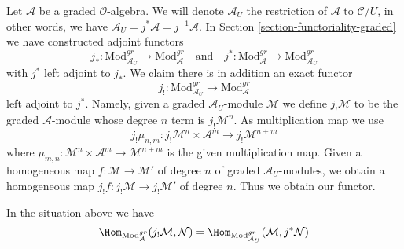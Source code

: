 \medskip\noindent
Let $\mathcal{A}$ be a graded $\mathcal{O}$-algebra.
We will denote $\mathcal{A}_U$ the restriction of $\mathcal{A}$
to $\mathcal{C}/U$, in other words, we have
$\mathcal{A}_U = j^*\mathcal{A} = j^{-1}\mathcal{A}$.
In Section \ref{section-functoriality-graded}
we have constructed adjoint functors
$$
j_* :
\text{Mod}^{gr}_{\mathcal{A}_U}
\longrightarrow
\text{Mod}^{gr}_\mathcal{A}
\quad\text{and}\quad
j^* :
\text{Mod}^{gr}_\mathcal{A}
\longrightarrow
\text{Mod}^{gr}_{\mathcal{A}_U}
$$
with $j^*$ left adjoint to $j_*$. We claim there is in addition an
exact functor
$$
j_! :
\text{Mod}^{gr}_{\mathcal{A}_U}
\longrightarrow
\text{Mod}^{gr}_\mathcal{A}
$$
left adjoint to $j^*$. Namely, given a graded $\mathcal{A}_U$-module
$\mathcal{M}$ we define $j_!\mathcal{M}$ to be the graded $\mathcal{A}$-module
whose degree $n$ term is $j_!\mathcal{M}^n$. As multiplication map
we use
$$
j_!\mu_{n, m} :
j_!\mathcal{M}^n \times \mathcal{A}^m \to
j_!\mathcal{M}^{n + m}
$$
where $\mu_{m, n} : \mathcal{M}^n \times \mathcal{A}^m \to \mathcal{M}^{n + m}$
is the given multiplication map. Given a homogeneous map
$f : \mathcal{M} \to \mathcal{M}'$ of degree $n$ of graded
$\mathcal{A}_U$-modules, we obtain a homogeneous map
$j_!f : j_!\mathcal{M} \to j_!\mathcal{M}'$ of degree $n$.
Thus we obtain our functor.

\begin{lemma}
\label{lemma-extension-by-zero-graded}
In the situation above we have
$$
\Hom_{\text{Mod}_\mathcal{A}^{gr}}(
j_!\mathcal{M}, \mathcal{N}) =
\Hom_{\text{Mod}_{\mathcal{A}_U}^{gr}}(
\mathcal{M}, j^*\mathcal{N})
$$
\end{lemma}

